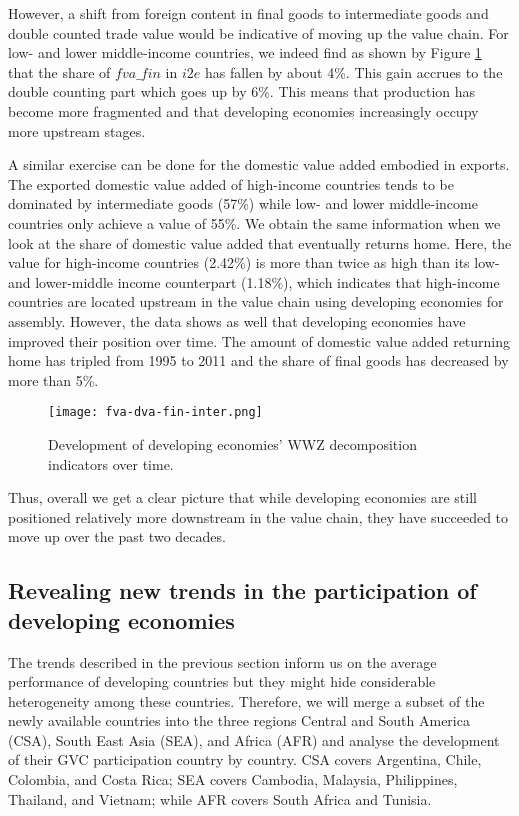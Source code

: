 \documentclass[11pt,a4paper]{article}
\begin{document}
However, a shift from foreign content in final goods to intermediate goods and double counted trade value would be indicative of moving up the value chain. For low- and lower middle-income countries, we indeed find as shown by Figure \ref{fig:llmwwz} that the share of $fva\_fin$ in $i2e$ has fallen by about 4\%. This gain accrues to the double counting part which goes up by 6\%. This means that production has become more fragmented and that developing economies increasingly occupy more upstream stages.

A similar exercise can be done for the domestic value added embodied in exports. The exported domestic value added of high-income countries tends to be dominated by intermediate goods (57\%) while low- and lower middle-income countries only achieve a value of 55\%. We obtain the same information when we look at the share of domestic value added that eventually returns home. Here, the value for high-income countries (2.42\%) is more than twice as high than its low- and lower-middle income counterpart (1.18\%), which indicates that high-income countries are located upstream in the value chain using developing economies for assembly. However, the data shows as well that developing economies have improved their position over time. The amount of domestic value added returning home has tripled from 1995 to 2011 and the share of final goods has decreased by more than 5\%. 

\begin{figure}
\centering
\texttt{[image: fva-dva-fin-inter.png]}
\caption{Development of developing economies' WWZ decomposition indicators over time.}
\label{fig:llmwwz}
\end{figure}

Thus, overall we get a clear picture that while developing economies are still positioned relatively more downstream in the value chain, they have succeeded to move up over the past two decades.



\subsection{Revealing new trends in the participation of developing economies}

The trends described in the previous section inform us on the average performance of developing countries but they might hide considerable heterogeneity among these countries. 
Therefore, we will merge a subset of the newly available countries into the three regions Central and South America (CSA), South East Asia (SEA), and Africa (AFR) and analyse the development of their GVC participation country by country. CSA covers Argentina, Chile, Colombia, and Costa Rica; SEA covers Cambodia, Malaysia, Philippines, Thailand, and Vietnam; while AFR covers South Africa and Tunisia.\\\
\end{document}
